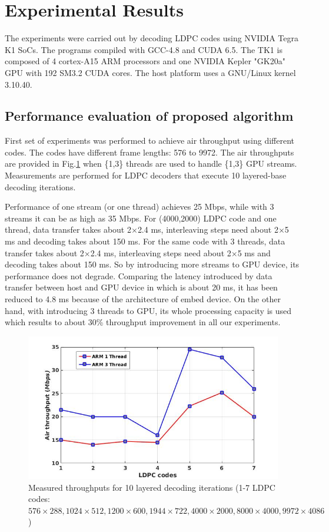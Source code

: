 \documentclass[conference]{IEEEtran}
\begin{document}
\section{Experimental Results} \label{sec4}

The experiments were carried out by decoding LDPC codes using NVIDIA Tegra K1 SoCs. The programs compiled with GCC-4.8 and CUDA 6.5. The TK1 is composed of 4 cortex-A15 ARM processors and one NVIDIA Kepler "GK20a" GPU with 192 SM3.2 CUDA cores. The host platform uses a GNU/Linux kernel 3.10.40.

\subsection{Performance evaluation of proposed algorithm} 
First set of experiments was performed to achieve air throughput using different codes. The codes have different frame lengths: 576 to 9972. The air throughputs are provided in Fig.\ref{fig::air} when \{1,3\} threads are used to handle \{1,3\} GPU streams. Measurements are performed for LDPC decoders that execute 10 layered-base decoding iterations.

Performance of one stream (or one thread) achieves 25 Mbps, while with 3 streams it can be as high as 35 Mbps. For (4000,2000) LDPC code and one thread, data transfer takes about 2$\times$2.4 ms, interleaving steps need about 2$\times$5 ms and decoding takes about 150 ms. For the same code with 3 threads, data transfer takes about 2$\times$2.4 ms, interleaving steps need about 2$\times$5 ms and decoding takes about 150 ms. So by introducing more streams to GPU device, its performance does not degrade. Comparing the latency introduced by data transfer between host and GPU device in \cite{art_gpu_0} which is about 20 ms, it has been reduced to 4.8 ms because of the architecture of embed device. On the other hand, with introducing 3 threads to GPU, its whole processing capacity is used which results to about 30\% throughput improvement in all our experiments.

\begin{figure}[h]
\begin{centering}
\includegraphics[scale=0.35]{air.jpg}
\caption[width=.5\textwidth]{Measured throughputs for 10 layered decoding iterations (1-7 LDPC codes: $576 \times 288, 1024 \times 512, 1200 \times 600, 1944 \times 722, 4000 \times 2000, 8000 \times 4000, 9972 \times 4086$)}\label{fig::air}
\end{centering}
\end{figure}
\end{document}
